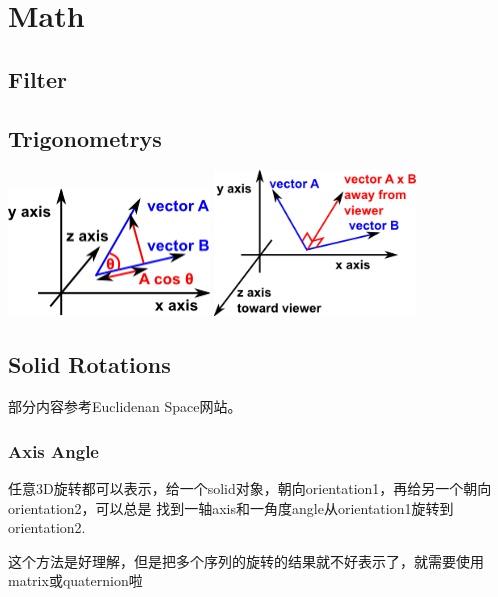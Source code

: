 \chapter{Math}

\section{Filter}



\section{Trigonometrys}

\begin{center}
    \includegraphics[width=0.4\textwidth]{images/dotProduct.png}
    \includegraphics[width=0.4\textwidth]{images/crossProduct.png}
\end{center}


\section{Solid Rotations}

部分内容参考Euclidenan Space网站\cite{Euclideanspace}。

\subsection{Axis Angle}

任意3D旋转都可以表示，给一个solid对象，朝向orientation1，再给另一个朝向orientation2，可以总是
找到一轴axis和一角度angle从orientation1旋转到orientation2.

这个方法是好理解，但是把多个序列的旋转的结果就不好表示了，就需要使用matrix或quaternion啦

